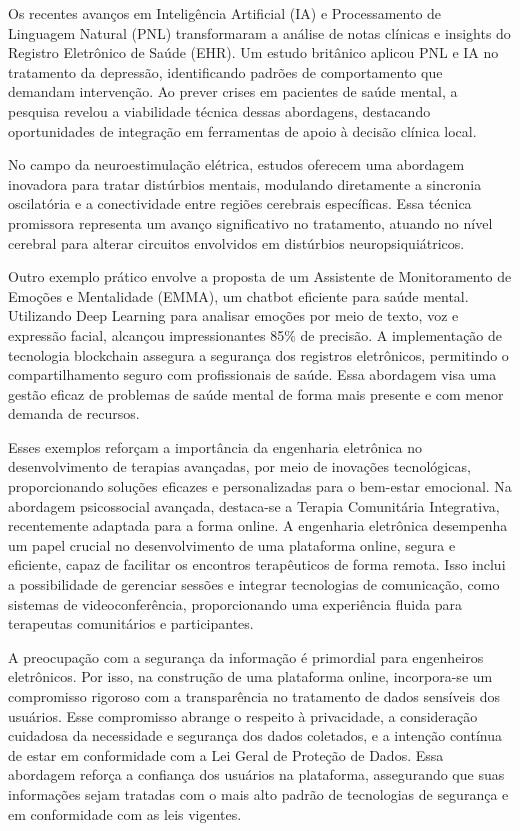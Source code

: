 Os recentes avanços em Inteligência Artificial (IA) e Processamento de Linguagem Natural (PNL) transformaram a análise de notas clínicas e insights do Registro Eletrônico de Saúde (EHR). Um estudo britânico aplicou PNL e IA no tratamento da depressão, identificando padrões de comportamento que demandam intervenção. Ao prever crises em pacientes de saúde mental, a pesquisa revelou a viabilidade técnica dessas abordagens, destacando oportunidades de integração em ferramentas de apoio à decisão clínica local. \cite{MSOSA}

No campo da neuroestimulação elétrica, estudos oferecem uma abordagem inovadora para tratar distúrbios mentais, modulando diretamente a sincronia oscilatória e a conectividade entre regiões cerebrais específicas. Essa técnica promissora representa um avanço significativo no tratamento, atuando no nível cerebral para alterar circuitos envolvidos em distúrbios neuropsiquiátricos.\cite{LO}

Outro exemplo prático envolve a proposta de um Assistente de Monitoramento de Emoções e Mentalidade (EMMA), um chatbot eficiente para saúde mental. Utilizando Deep Learning para analisar emoções por meio de texto, voz e expressão facial, alcançou impressionantes 85\% de precisão. A implementação de tecnologia blockchain assegura a segurança dos registros eletrônicos, permitindo o compartilhamento seguro com profissionais de saúde. Essa abordagem visa uma gestão eficaz de problemas de saúde mental de forma mais presente e com menor demanda de recursos.\cite{EMMA}

Esses exemplos reforçam a importância da engenharia eletrônica no desenvolvimento de terapias avançadas, por meio de inovações tecnológicas, proporcionando soluções eficazes e personalizadas para o bem-estar emocional. Na abordagem psicossocial avançada, destaca-se a Terapia Comunitária Integrativa, recentemente adaptada para a forma online. A engenharia eletrônica desempenha um papel crucial no desenvolvimento de uma plataforma online, segura e eficiente, capaz de facilitar os encontros terapêuticos de forma remota. Isso inclui a possibilidade de gerenciar sessões e integrar tecnologias de comunicação, como sistemas de videoconferência, proporcionando uma experiência fluida para terapeutas comunitários e participantes.

A preocupação com a segurança da informação é primordial para engenheiros eletrônicos. Por isso, na construção de uma plataforma online, incorpora-se um compromisso rigoroso com a transparência no tratamento de dados sensíveis dos usuários. Esse compromisso abrange o respeito à privacidade, a consideração cuidadosa da necessidade e segurança dos dados coletados, e a intenção contínua de estar em conformidade com a Lei Geral de Proteção de Dados\cite{LGPD}. Essa abordagem reforça a confiança dos usuários na plataforma, assegurando que suas informações sejam tratadas com o mais alto padrão de tecnologias de segurança e em conformidade com as leis vigentes.

